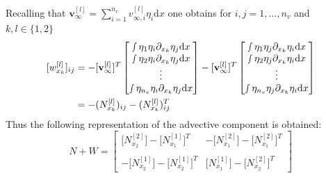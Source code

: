 \documentclass[a4paper,10pt,BCOR=15mm]{scrbook}
\providecommand{\inva}[1]{\text{d} #1}
\begin{document}
Recalling that $\mathbf v_{\infty}^{[l]} = \sum _{i=1}^{n_v} v_{\infty,i}^{[l]} \eta_i\inva x$ one obtains for $i,j=1,\dotsc,n_v$ and $k,l \in \{1,2\}$
\begin{align}\label{estim}
 [w_{x_k}^{[l]}]_{ij} &= -[\mathbf v_\infty ^{[l]}]^T \begin{bmatrix} \smallint \eta_1 \eta_i \partial_{x_k} \eta_j\inva x \\ \smallint \eta_2 \eta_i \partial_{x_k} \eta_j \inva x\\ \vdots \\ \smallint \eta_{n_v} \eta_i \partial_{x_k} \eta_j \inva x\end{bmatrix}  - [\mathbf v_\infty ^{[l]}]^T \begin{bmatrix} \smallint \eta_1 \eta_j \partial_{x_k} \eta_i \inva x\\ \smallint \eta_2 \eta_j \partial_{x_k} \eta_i\inva x \\ \vdots \\ \smallint \eta_{n_v} \eta_j \partial_{x_k} \eta_i \inva x\end{bmatrix}\\
&= - (N_{x_k}^{[l]})_{ij}- (N_{x_k}^{[l]})_{ij}^T
\end{align}
Thus the following representation of the advective component is obtained:
\begin{equation*}
 N+W=\begin{bmatrix} \bigr[N_{x_2}^{[2]}\bigl]- \bigr[N_{x_1}^{[1]}\bigl]^T &- \bigr[N_{x_1}^{[2]}\bigl]- \bigr[N_{x_1}^{[2]}\bigl]^T\\ &\\ -\bigr [N_{x_2}^{[1]}\bigl]- \bigr[N_{x_2}^{[1]}\bigl]^T&\bigr[N_{x_1}^{[1]}\bigl]- \bigr[N_{x_2}^{[2]}\bigl]^T \end{bmatrix}
\end{equation*}
\end{document}
